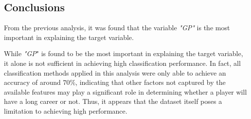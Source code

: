 \subsection{Conclusions}

From the previous analysis, it was found that the variable \textit{"GP"} is the most important in explaining the target variable. 

While \textit{"GP}" is found to be the most important in explaining the target variable, it alone is not sufficient in achieving high classification performance. In fact, all classification methods applied in this analysis were only able to achieve an accuracy of around $70\%$, indicating that other factors not captured by the available features may play a significant role in determining whether a player will have a long career or not. Thus, it appears that the dataset itself poses a limitation to achieving high performance.